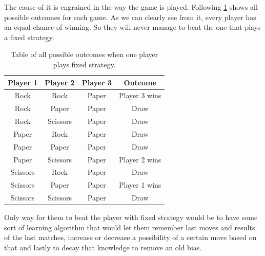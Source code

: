 \documentclass[a4,12pt]{extarticle}
\begin{document}
The cause of it is engrained in the way the game is played. Following \cref{tab:outcomes} shows all possible outcomes for each game. As we can clearly see from it, every player has an equal chance of winning. So they will never manage to beat the one that plays a fixed strategy.

\begin{table}[H]
  \centering
  \begin{tabular}{|c|c|c|c|}
    \hline
    \textbf{Player 1} & \textbf{Player 2} & \textbf{Player 3} & \textbf{Outcome} \\ \hline
    Rock              & Rock              & Paper             & Player 3 wins    \\
    Rock              & Paper             & Paper             & Draw             \\
    Rock              & Scissors          & Paper             & Draw             \\
    Paper             & Rock              & Paper             & Draw             \\
    Paper             & Paper             & Paper             & Draw             \\
    Paper             & Scissors          & Paper             & Player 2 wins    \\
    Scissors          & Rock              & Paper             & Draw             \\
    Scissors          & Paper             & Paper             & Player 1 wins    \\
    Scissors          & Scissors          & Paper             & Draw             \\ \hline
  \end{tabular}
  \caption{Table of all possible outcomes when one player plays fixed strategy.}
  \label{tab:outcomes}
\end{table}

Only way for them to beat the player with fixed strategy would be to have some sort of learning algorithm that would let them remember last moves and results of the last matches, increase or decrease a possibility of a certain move based on that and lastly to decay that knowledge to remove an old bias.
\end{document}

